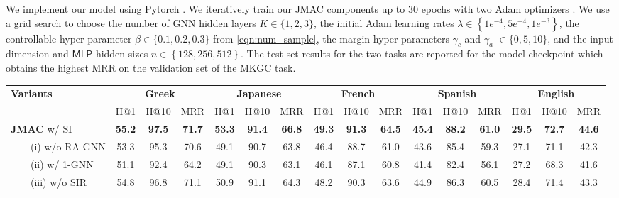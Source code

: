 \documentclass[11pt]{article}
\begin{document}
We implement our model using  Pytorch \cite{NEURIPS2019_9015}.
We iteratively train our JMAC components up to 30 epochs with two Adam optimizers \cite{kingma2014adam}. We use a grid search to choose the number of GNN hidden layers $K \in \{1, 2, 3\}$, the initial Adam learning rates $ \lambda \in \left\{1e^{-4}, 5e^{-4}, 1e^{-3} \right\}$, the controllable hyper-parameter $\beta\in \{0.1, 0.2, 0.3\}$ from \autoref{eqn:num_sample}, the margin hyper-parameters $\gamma_c$ and $\gamma_a$ $\in \{0, 5, 10\}$, and the input dimension and $\mathsf{MLP}$ hidden sizes $n \in \left\{128, 256, 512 \right\}$.  
The test set results for the two tasks are reported for the model checkpoint which obtains the highest MRR on the validation set of the MKGC task.




\begin{table*}[!t]
    \begin{adjustbox}{width=440pt,center}
    \centering
    \setlength{\tabcolsep}{0.2em}
    \def\arraystretch{1.15}
    \begin{tabular}{l|ccc|ccc|ccc|ccc|ccc}
    \hline
    \multirow{2}{*}{\bf Variants} & 
    \multicolumn{3}{c|}{\bf Greek} &
    \multicolumn{3}{c|}{\bf Japanese} &
    \multicolumn{3}{c|}{\bf French} &
    \multicolumn{3}{c|}{\bf Spanish} &
    \multicolumn{3}{c}{\bf English} \\
    \cline{2-16} 
    & H@1 & H@10 & MRR & H@1 & H@10 & MRR & H@1 & H@10 & MRR & H@1 & H@10 & MRR& H@1 & H@10 & MRR  \\
    \hline
    \textbf{JMAC} w/ SI & \textbf{55.2} & \textbf{97.5} & \textbf{71.7} & \textbf{53.3} & \textbf{91.4} & \textbf{66.8} & \textbf{49.3} & \textbf{91.3} & \textbf{64.5} & \textbf{45.4} & \textbf{88.2} & \textbf{61.0} & \textbf{29.5} & \textbf{72.7} & \textbf{44.6} \\
    \hline
    \ \ \ \ (i) w/o RA-GNN & 53.3 & 95.3 & 70.6 & 49.1 & 90.7 & 63.8 & 46.4 & 88.7 & 61.0 & 43.6 & 85.4 & 59.3 & 27.1 & 71.1 & 42.3  \\
    \ \ \ \ (ii)  w/ 1-GNN & 51.1 & 92.4 & 64.2 & 49.1 & 90.3 & 63.1 & 46.1 & 87.1 & 60.8 & 41.4 & 82.4 & 56.1 & 27.2 & 68.3 & 41.6 \\
\ \ \ \ (iii) w/o SIR & \underline{54.8} & \underline{96.8} & \underline{71.1} & \underline{50.9} & \underline{91.1} & \underline{64.3} & \underline{48.2} & \underline{90.3} & \underline{63.6} & \underline{44.9} & \underline{86.3} & \underline{60.5} & \underline{28.4} & \underline{71.4} & \underline{43.3} \\

\end{tabular}
\end{adjustbox}
\end{table*}
\end{document}
